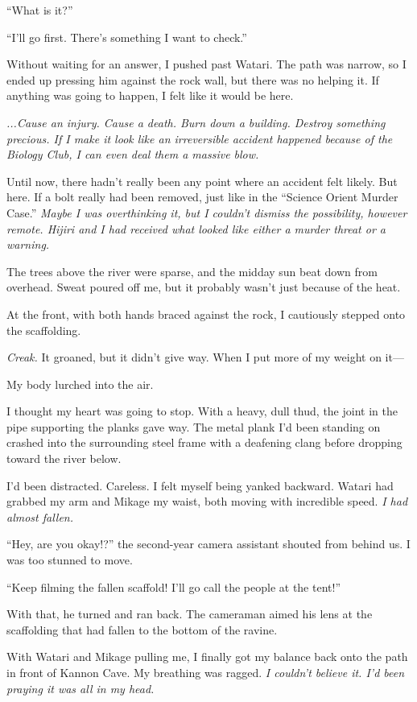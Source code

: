 \documentclass[
    a4paper,
    12pt,
    twoside,
    openany,
    UTF8,
    fontset=windows
]{ctexbook}
\begin{document}
``What is it?''

``I'll go first. There's something I want to check.''

Without waiting for an answer, I pushed past Watari. The path was narrow, so I ended up pressing him against the rock wall, but there was no helping it. If anything was going to happen, I felt like it would be here.

\textit{...Cause an injury. Cause a death. Burn down a building. Destroy something precious. If I make it look like an irreversible accident happened because of the Biology Club, I can even deal them a massive blow.}

Until now, there hadn't really been any point where an accident felt likely. But here. If a bolt really had been removed, just like in the ``Science Orient Murder Case.'' \textit{Maybe I was overthinking it, but I couldn't dismiss the possibility, however remote. Hijiri and I had received what looked like either a murder threat or a warning.}

The trees above the river were sparse, and the midday sun beat down from overhead. Sweat poured off me, but it probably wasn't just because of the heat.

At the front, with both hands braced against the rock, I cautiously stepped onto the scaffolding.

\textit{Creak.} It groaned, but it didn't give way. When I put more of my weight on it---

My body lurched into the air.

I thought my heart was going to stop. With a heavy, dull thud, the joint in the pipe supporting the planks gave way. The metal plank I'd been standing on crashed into the surrounding steel frame with a deafening clang before dropping toward the river below.

I'd been distracted. Careless. I felt myself being yanked backward. Watari had grabbed my arm and Mikage my waist, both moving with incredible speed. \textit{I had almost fallen.}

``Hey, are you okay!?'' the second-year camera assistant shouted from behind us. I was too stunned to move.

``Keep filming the fallen scaffold! I'll go call the people at the tent!''

With that, he turned and ran back. The cameraman aimed his lens at the scaffolding that had fallen to the bottom of the ravine.

With Watari and Mikage pulling me, I finally got my balance back onto the path in front of Kannon Cave. My breathing was ragged. \textit{I couldn't believe it. I'd been praying it was all in my head.}
\end{document}
